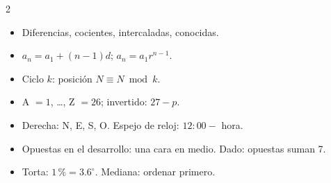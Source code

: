 \begin{multicols}{2}
\begin{itemize}
\end{itemize}
\begin{itemize}
  \item Diferencias, cocientes, intercaladas, conocidas.
  \item $a_n = a_1 + (n - 1)d$; $a_n = a_1 r^{n-1}$.
  \item Ciclo $k$: posición $N \equiv N \bmod k$.
  \item A $= 1$, …, Z $= 26$; invertido: $27 - p$.
\end{itemize}
\begin{itemize}
  \item Derecha: N, E, S, O. Espejo de reloj: $12{:}00 -$ hora.
  \item Opuestas en el desarrollo: una cara en medio. Dado: opuestas suman 7.
  \item Torta: $1\,\% = 3.6^\circ$. Mediana: ordenar primero.
\end{itemize}
\end{multicols}

